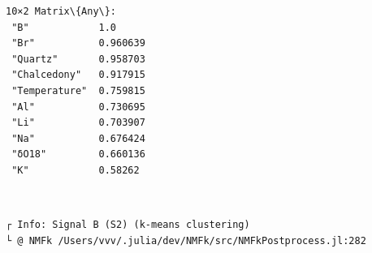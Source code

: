 \documentclass[11pt]{article}
\begin{document}
    \begin{Verbatim}[commandchars=\\\{\}]
10×2 Matrix\{Any\}:
 "B"            1.0
 "Br"           0.960639
 "Quartz"       0.958703
 "Chalcedony"   0.917915
 "Temperature"  0.759815
 "Al"           0.730695
 "Li"           0.703907
 "Na"           0.676424
 "δO18"         0.660136
 "K"            0.58262
    \end{Verbatim}


    \begin{center}
    \end{center}
    { \hspace*{\fill} \\}

    \begin{Verbatim}[commandchars=\\\{\}]
┌ Info: Signal B (S2) (k-means clustering)
└ @ NMFk /Users/vvv/.julia/dev/NMFk/src/NMFkPostprocess.jl:282
    \end{Verbatim}

    \begin{center}
    \end{center}
    { \hspace*{\fill} \\}

    \begin{Verbatim}[commandchars=\\\{\}]

    \end{Verbatim}

    \begin{center}
    \end{center}
    { \hspace*{\fill} \\}

    \begin{center}
    \end{center}
    { \hspace*{\fill} \\}

    \begin{Verbatim}[commandchars=\\\{\}]

    \end{Verbatim}
\end{document}
